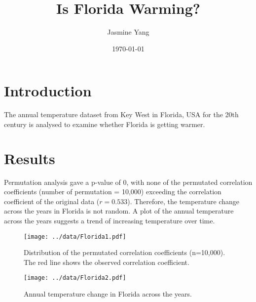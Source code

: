 \documentclass[12pt, a4paper]{article}
\title{Is Florida Warming?}
\author{Jasmine Yang}
\date{\today}
\begin{document}
  \thispagestyle{empty}  
  \maketitle

  
  \section*{Introduction}
  The annual temperature dataset from Key West in Florida, USA for the 20th century is analysed to examine   whether Florida is getting warmer.
  
  
  \section*{Results}
    Permutation analysis gave a p-value of 0, with none of the permutated correlation coefficients (number of permutation = 10,000) exceeding the correlation coefficient of the original data  ($r = 0.533$).
Therefore, the temperature change across the years in Florida is not random.
A plot of the annual temperature across the years suggests a trend of increasing temperature over time. 

  \begin{figure}[h]
  \begin{center}
    \texttt{[image: ../data/Florida1.pdf]}    
    \label{Fig1}
    \caption{Distribution of the permutated correlation coefficients (n=10,000). The red line shows the observed correlation coefficient.}
  \end{center}
  \end{figure}
  
  
  \begin{figure}[h]
  \begin{center}
  \texttt{[image: ../data/Florida2.pdf]}
    \label{Fig2}
    \caption{Annual temperature change in Florida across the years. }  
  \end{center}
  \end{figure}
\end{document}
